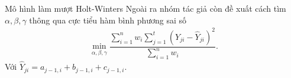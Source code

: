 \begin{frame}{Mô hình làm mượt Holt-Winters}
        Ngoài ra nhóm tác giả còn đề xuất cách tìm $\alpha, \beta, \gamma$ thông qua cực tiểu hàm bình phương sai số
    \begin{align}
        \min_{\alpha, \beta,\gamma} \dfrac{\sum_{i=1}^n w_i \sum_{j=1}^t \left(Y_{ji} - \hat{Y}_{ji}\right)^2}{\sum_{i=1}^n w_i}.
    \end{align}
    Với $\hat{Y}_{ji} = a_{j-1, i} + b_{j-1,i} + c_{j-1,i}$.
\end{frame}